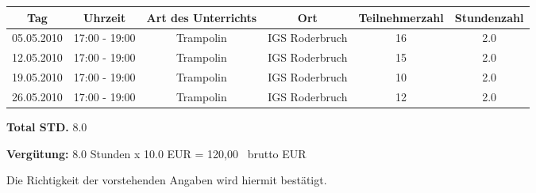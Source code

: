 \documentclass[a4paper,10pt,BCOR=0mm]{scrreprt}
\begin{document}
\begin{flushright}
\begin{tabular}{|c|c|c|c|c|c|}\hline
 \textbf{Tag}
&
 \textbf{Uhrzeit}
&
 \textbf{Art des Unterrichts}
&
\textbf{Ort}
&
\textbf{Teilnehmerzahl}
&
 \textbf{Stundenzahl}\\\hline\hline

05.05.2010
&
17:00 - 19:00
&
Trampolin
&
IGS Roderbruch
&
16
&
2.0
\\\hline


12.05.2010
&
17:00 - 19:00
&
Trampolin
&
IGS Roderbruch
&
15
&
2.0
\\\hline


19.05.2010
&
17:00 - 19:00
&
Trampolin
&
IGS Roderbruch
&
10
&
2.0
\\\hline


26.05.2010
&
17:00 - 19:00
&
Trampolin
&
IGS Roderbruch
&
12
&
2.0
\\\hline



\end{tabular} 
\begin{flushright}
\parbox{5cm}{\textbf{Total STD.} 8.0}\end{flushright}
\hfill\hfill \textbf{Vergütung:} 8.0 Stunden x 10.0 EUR = 120,00 \officialeuro\  brutto EUR \hspace*{2cm}\\
\end{flushright}
\vfill
Die Richtigkeit der vorstehenden Angaben wird hiermit bestätigt.\\
\end{document}
